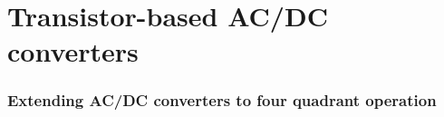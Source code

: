 \section{Transistor-based AC/DC converters}

\begin{frame}
	\frametitle{Extending AC/DC converters to four quadrant operation}
	\begin{columns}
		\begin{column}{0.5\textwidth}
			

\end{column}
\end{columns}
\end{frame}
